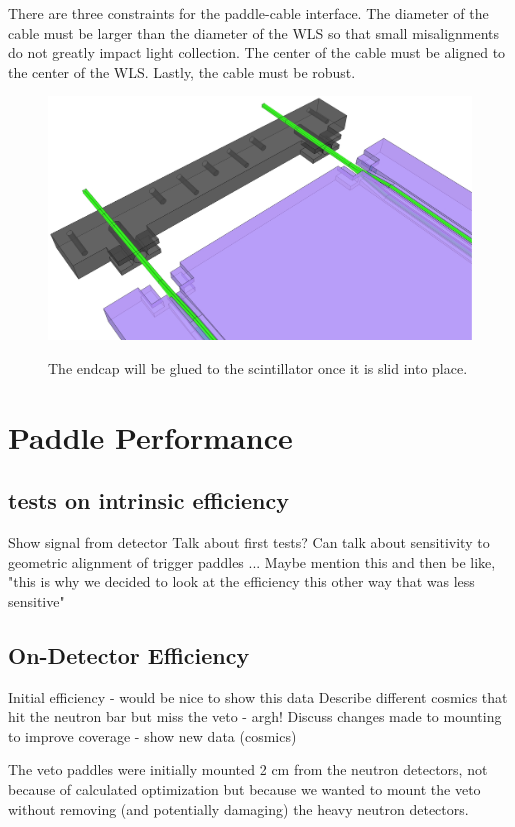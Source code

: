 There are three constraints for the paddle-cable interface.  The diameter of the cable must be larger than the diameter of the WLS so that small misalignments do not greatly impact light collection.  The center of the cable must be aligned to the center of the WLS.  Lastly, the cable must be robust.

\begin{figure}[ht]
\centering
\includegraphics[width=1.0\textwidth]{figures/veto_assembly.eps}
\label{fig:paddleAssembly}
\caption{The endcap will be glued to the scintillator once it is slid into place.}
\end{figure}

\section{Paddle Performance}
\subsection{tests on intrinsic efficiency}
Show signal from detector
Talk about first tests?  Can talk about sensitivity to geometric alignment of trigger paddles ...
Maybe mention this and then be like, "this is why we decided to look at the efficiency this other way that was less sensitive"

\subsection{On-Detector Efficiency}
Initial efficiency - would be nice to show this data
Describe different cosmics that hit the neutron bar but miss the veto - argh!
Discuss changes made to mounting to improve coverage - show new data (cosmics)

The veto paddles were initially mounted 2 cm from the neutron detectors, not because of calculated optimization but because we wanted to mount the veto without removing (and potentially damaging) the heavy neutron detectors.

